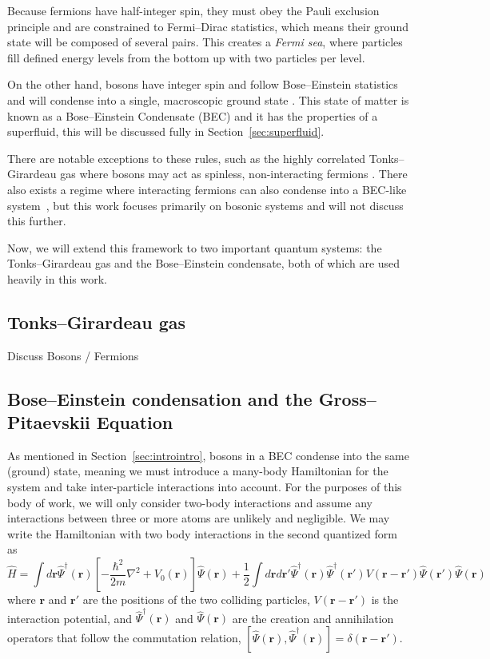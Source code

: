 Because fermions have half-integer spin, they must obey the Pauli exclusion principle and are constrained to Fermi--Dirac statistics, which means their ground state will be composed of several pairs.
This creates a \textit{Fermi sea}, where particles fill defined energy levels from the bottom up with two particles per level.

On the other hand, bosons have integer spin and follow Bose--Einstein statistics and will condense into a single, macroscopic ground state \cite{Einstein1925, Fetter2003}.
This state of matter is known as a Bose--Einstein Condensate (BEC) and it has the properties of a superfluid, this will be discussed fully in Section~\ref{sec:superfluid}.

There are notable exceptions to these rules, such as the highly correlated Tonks--Girardeau gas where bosons may act as spinless, non-interacting fermions \cite{Girardeau}.
There also exists a regime where interacting fermions can also condense into a BEC-like system~\cite{Nozieres1985, Bulgac2014}, but this work focuses primarily on bosonic systems and will not discuss this further.

Now, we will extend this framework to two important quantum systems: the Tonks--Girardeau gas and the Bose--Einstein condensate, both of which are used heavily in this work.

\subsection{Tonks--Girardeau gas}

Discuss Bosons / Fermions

\subsection{Bose--Einstein condensation and the Gross--Pitaevskii Equation}

As mentioned in Section~\ref{sec:introintro}, bosons in a BEC condense into the same (ground) state, meaning we must introduce a many-body Hamiltonian for the system and take inter-particle interactions into account.
For the purposes of this body of work, we will only consider two-body interactions and assume any interactions between three or more atoms are unlikely and negligible.
We may write the Hamiltonian with two body interactions in the second quantized form as
\begin{equation}
    \hat H = \int d\mathbf{r} \hat \Psi^\dagger(\mathbf{r})\left[-\frac{\hbar^2}{2m}\nabla^2 + V_0(\mathbf{r}) \right]\hat \Psi(\mathbf{r}) + \frac{1}{2} \int d\mathbf{r} d\mathbf{r'} \hat \Psi^\dagger(\mathbf{r}) \hat \Psi^\dagger(\mathbf{r'}) V(\mathbf{r} - \mathbf{r'})\hat \Psi(\mathbf{r'}) \hat \Psi(\mathbf{r})
    \label{eqn:2nd}
\end{equation}
where $\mathbf{r}$ and $\mathbf{r'}$ are the positions of the two colliding particles, $V(\mathbf{r}-\mathbf{r'})$ is the interaction potential, and $\hat \Psi^\dagger(\mathbf{r})$ and $\hat \Psi(\mathbf{r})$ are the creation and annihilation operators that follow the commutation relation, $[\hat \Psi(\mathbf{r}),\hat \Psi^\dagger(\mathbf{r})] = \delta(\mathbf{r} - \mathbf{r'})$.

